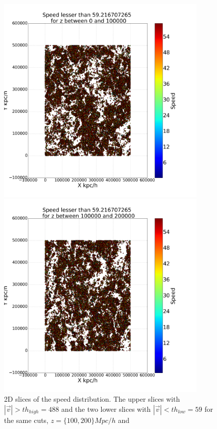 \documentclass[12pt]{article}
\begin{document}
\begin{figure}[ht]
\begin{minipage}{.45\textwidth}
\end{minipage}
\begin{minipage}{.45\textwidth}
  \centering
  \includegraphics[width=0.9\textwidth]{graphs/scatter_magnitud_vel_59_lz_100000.png}
\end{minipage}
\begin{minipage}{.45\textwidth}
  \centering
  \includegraphics[width=0.9\textwidth]{graphs/scatter_magnitud_vel_59_lz_200000.png}
\end{minipage}
\caption{2D slices of the speed distribution. The upper slices with $|\vec{v}| > th_{high} = 488$ and the two lower slices with $|\vec{v}| < th_{low} = 59$ for the same cuts, $z = \{100, 200 \} Mpc/h$ and }\label{fig:2D_slices_thresh}
\end{figure}
\FloatBarrier
\end{document}
